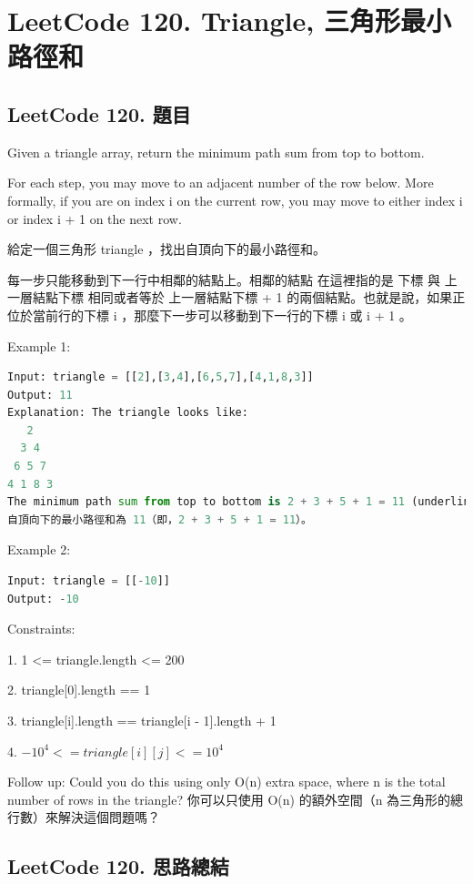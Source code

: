 \documentclass[10pt,UTF8]{ctexart}
\begin{document}
\newpage

\section{LeetCode 120. Triangle, 三角形最小路徑和}

\subsection{LeetCode 120. 題目}

Given a triangle array, return the minimum path sum from top to bottom.

For each step, you may move to an adjacent number of the row below. More formally, if you are on index i on the current row, you may move to either index i or index i + 1 on the next row.

給定一個三角形 triangle ，找出自頂向下的最小路徑和。

每一步只能移動到下一行中相鄰的結點上。相鄰的結點 在這裡指的是 下標 與 上一層結點下標 相同或者等於 上一層結點下標 + 1 的兩個結點。也就是說，如果正位於當前行的下標 i ，那麼下一步可以移動到下一行的下標 i 或 i + 1 。

Example 1:

\begin{lstlisting}[language={python}]
Input: triangle = [[2],[3,4],[6,5,7],[4,1,8,3]]
Output: 11
Explanation: The triangle looks like:
   2
  3 4
 6 5 7
4 1 8 3
The minimum path sum from top to bottom is 2 + 3 + 5 + 1 = 11 (underlined above).
自頂向下的最小路徑和為 11（即，2 + 3 + 5 + 1 = 11）。
\end{lstlisting}

Example 2:
\begin{lstlisting}[language={python}]
Input: triangle = [[-10]]
Output: -10
\end{lstlisting}

Constraints:

1. 1 <= triangle.length <= 200

2. triangle[0].length == 1

3. triangle[i].length == triangle[i - 1].length + 1

4. $-10^{4} <= triangle[i][j] <= 10^{4}$

Follow up: Could you do this using only O(n) extra space, where n is the total number of rows in the triangle?
你可以只使用 O(n) 的額外空間（n 為三角形的總行數）來解決這個問題嗎？

\subsection{LeetCode 120. 思路總結}
\end{document}
